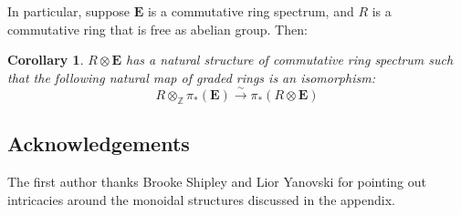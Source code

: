 \documentclass[12pt]{amsart}
\def\oo{\otimes}
\newcommand{\Z}{\mathbb{Z}}
\numberwithin{equation}{section}
\theoremstyle{plain}
\newtheorem{cor}[equation]{Corollary}
\theoremstyle{definition}
\theoremstyle{remark}
\begin{document}
 In particular, suppose $\mathbf{E}$ is a commutative ring spectrum, and $R$ is a commutative ring that is free as abelian group. Then:

 \begin{cor}\label{cor:algebras}
$R\otimes\mathbf{E}$ has a natural structure of
commutative ring spectrum such that the following
natural map of graded rings is an isomorphism:
\[
R\oo_\Z \pi_* (\mathbf{E})   \xrightarrow{\sim}
\pi_*(R\otimes\mathbf{E})
\]
 \end{cor} 
 
 
 \subsection*{Acknowledgements} The first author thanks
 Brooke Shipley and Lior Yanovski for pointing out intricacies
 around the monoidal structures discussed in the appendix. 
\end{document}
